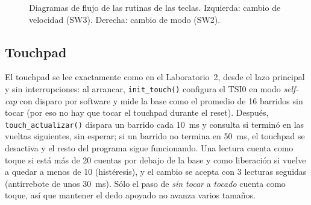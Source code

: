 \documentclass[11pt,a4paper]{article}
\begin{document}
\begin{figure}[H]
\centering
{}
\caption{Diagramas de flujo de las rutinas de las teclas. Izquierda: cambio
de velocidad (SW3). Derecha: cambio de modo (SW2).}
\label{fig:flujo-teclas}
\end{figure}

\subsection{Touchpad}

El touchpad se lee exactamente como en el Laboratorio~2, desde el lazo
principal y sin interrupciones: al arrancar, \texttt{init\_touch()} configura
el TSI0 en modo \emph{self-cap} con disparo por software y mide la base como
el promedio de 16 barridos sin tocar (por eso no hay que tocar el touchpad
durante el reset). Después, \texttt{touch\_actualizar()} dispara un barrido
cada \qty{10}{\milli\second} y consulta si terminó en las vueltas
siguientes, sin esperar; si un barrido no termina en
\qty{50}{\milli\second}, el touchpad se desactiva y el resto del programa
sigue funcionando. Una lectura cuenta como toque si está más de 20 cuentas
por debajo de la base y como liberación si vuelve a quedar a menos de 10
(histéresis), y el cambio se acepta con 3 lecturas seguidas (antirrebote de
unos \qty{30}{\milli\second}). Sólo el paso de \emph{sin tocar} a
\emph{tocado} cuenta como toque, así que mantener el dedo apoyado no avanza
varios tamaños.
\end{document}
